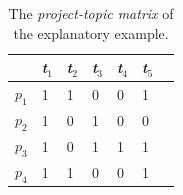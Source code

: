 \begin{table}[h!]

	\begin{tabular}{|p{0.5cm}|p{0.5cm}|p{0.5cm}|p{0.5cm}|p{0.5cm}|p{0.5cm}|p{0.5cm}|} \hline
		& \emph{t$_1$} & \emph{t$_2$} & \emph{t$_3$} & \emph{t$_4$} & \emph{t$_{5}$} \\ \hline
		$p_1$ & 1 & 1 & 0 & 0 & 1 \\ \hline
		$p_2$ & 1 & 0 & 1 & 0 & 0 \\ \hline
		$p_3$ & 1 & 0 & 1 & 1 & 1 \\ \hline
		$p_4$ & 1 & 1 & 0 & 0 & 1 \\ \hline
	\end{tabular}
	\caption{The \emph{project-topic matrix} of the explanatory example.}
    \label{tab:repo-topic-matrix}
\end{table}





